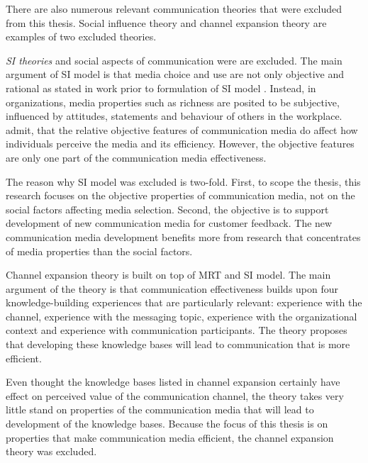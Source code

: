 \documentclass[english,12pt,a4paper,pdftex]{article}
\begin{document}
There are also numerous relevant communication theories that were excluded from this thesis. Social influence theory and channel expansion theory are examples of two excluded theories.

\emph{\Ac{SI} theories} and social aspects of communication were are excluded. The main argument of \ac{SI} model is that media choice and use are not only objective and rational as stated in work prior to formulation of \ac{SI} model \citep{fulk1987}. Instead, in organizations, media properties such as richness are posited to be subjective, influenced by attitudes, statements and behaviour of others in the workplace. \citet{schmitz1991} admit, that the relative objective features of communication media do affect how individuals perceive the media and its efficiency. However, the objective features are only one part of the communication media effectiveness.

The reason why \ac{SI} model was excluded is two-fold. First, to scope the thesis, this research focuses on the objective properties of communication media, not on the social factors affecting media selection. Second, the objective is to support development of new communication media for customer feedback. The new communication media development benefits more from research that concentrates of media properties than the social factors.

Channel expansion theory is built on top of \ac{MRT} and \ac{SI} model. The main argument of the theory is that communication effectiveness builds upon four knowledge-building experiences that are particularly relevant: experience with the channel, experience with the messaging topic, experience with the organizational context and experience with communication participants. The theory proposes that developing these knowledge bases will lead to communication that is more efficient. \citep{carlson1994} \citep{carlson1999}

Even thought the knowledge bases listed in channel expansion certainly have effect on perceived value of the communication channel, the theory takes very little stand on properties of the communication media that will lead to development of the knowledge bases. Because the focus of this thesis is on properties that make communication media efficient, the channel expansion theory was excluded.

\end{document}
